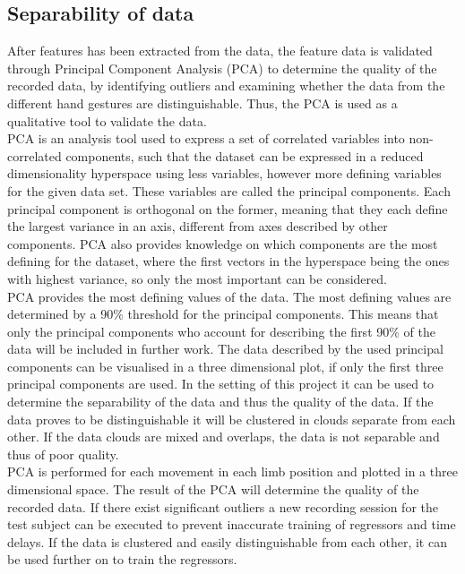 \subsection{Separability of data} \label{sec:dataValidation}


After features has been extracted from the data, the feature data is validated through Principal Component Analysis (PCA) to determine the quality of the recorded data, by identifying outliers and examining whether the data from the different hand gestures are distinguishable. Thus, the PCA is used as a qualitative tool to validate the data. \\
PCA is an analysis tool used to express a set of correlated variables into non-correlated components, such that the dataset can be expressed in a reduced dimensionality hyperspace using less variables, however more defining variables for the given data set. These variables are called the principal components. Each principal component is orthogonal on the former, meaning that they each define the largest variance in an axis, different from axes described by other components. PCA also provides knowledge on which components are the most defining for the dataset, where the first vectors in the hyperspace being the ones with highest variance, so only the most important can be considered. \cite{algebra} \\
PCA provides the most defining values of the data. The most defining values are determined by a 90\% threshold for the principal components. This means that only the principal components who account for describing the first 90\% of the data will be included in further work. The data described by the used principal components can be visualised in a three dimensional plot, if only the first three principal components are used. In the setting of this project it can be used to determine the separability of the data and thus the quality of the data. If the data proves to be distinguishable it will be clustered in clouds separate from each other. If the data clouds are mixed and overlaps, the data is not separable and thus of poor quality. \\
PCA is performed for each movement in each limb position and plotted in a three dimensional space. The result of the PCA will determine the quality of the recorded data. If there exist significant outliers a new recording session for the test subject can be executed to prevent inaccurate training of regressors and time delays. If the data is clustered and easily distinguishable from each other, it can be used further on to train the regressors. \cite{algebra}


